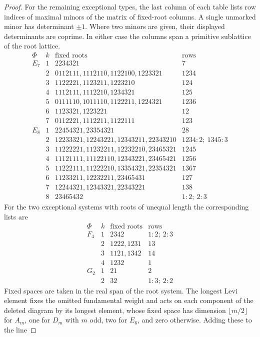 \documentclass[12pt]{amsart}
\numberwithin{equation}{section}
\theoremstyle{plain}
\theoremstyle{definition}
\theoremstyle{remark}
\begin{document}
\begin{proof}
For the remaining exceptional types, the last column of each table
lists row indices of maximal minors of the matrix of fixed-root
columns. A single unmarked minor has
determinant $\pm1$. Where two minors are given, their displayed
determinants are coprime. In either case the columns span a primitive
sublattice of the root lattice.
\[
\begin{array}{c|c|l|l}
\Phi&k&\text{fixed roots}&\text{rows}\\\hline
E_7&1&2234321&7\\
&2&0112111,1112110,1122100,1223321&1234\\
&3&1122221,1123211,1223210&124\\
&4&1112111,1112210,1234321&125\\
&5&0111110,1011110,1122211,1224321&1236\\
&6&1123321,1223221&12\\
&7&0112221,1112211,1122111&123\\\hline
E_8&1&22454321,23354321&28\\
&2&12233321,12243221,12343211,22343210&1234:2;\ 1345:3\\
&3&11222221,11232211,12232210,23465321&1245\\
&4&11121111,11122110,12343221,23465421&1256\\
&5&11222111,11222210,13354321,22354321&1367\\
&6&11233211,12232211,23465431&127\\
&7&12244321,12343321,22343221&138\\
&8&23465432&1:2;\ 2:3
\end{array}
\]
For the two exceptional systems with roots of unequal length the
corresponding lists are
\[
\begin{array}{c|c|l|l}
\Phi&k&\text{fixed roots}&\text{rows}\\\hline
F_4&1&2342&1:2;\ 2:3\\
&2&1222,1231&13\\
&3&1121,1342&14\\
&4&1232&1\\\hline
G_2&1&21&2\\
&2&32&1:3;\ 2:2
\end{array}
\]
Fixed spaces are taken in the real span of the root system.
The longest Levi element fixes the omitted fundamental weight and acts
on each component of the deleted diagram by its longest element, whose
fixed space has dimension $\lfloor m/2\rfloor$ for $A_m$, one for $D_m$
with $m$ odd, two for $E_6$, and zero otherwise. Adding these to the line

\end{proof}
\end{document}
